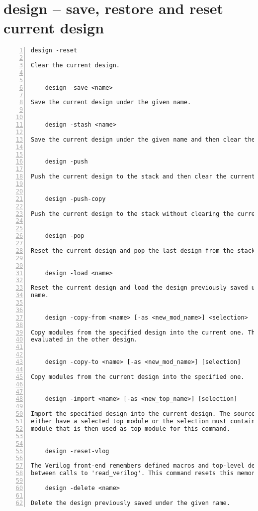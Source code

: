 \section{design -- save, restore and reset current design}
\label{cmd:design}
\begin{lstlisting}[numbers=left,frame=single]
    design -reset

Clear the current design.


    design -save <name>

Save the current design under the given name.


    design -stash <name>

Save the current design under the given name and then clear the current design.


    design -push

Push the current design to the stack and then clear the current design.


    design -push-copy

Push the current design to the stack without clearing the current design.


    design -pop

Reset the current design and pop the last design from the stack.


    design -load <name>

Reset the current design and load the design previously saved under the given
name.


    design -copy-from <name> [-as <new_mod_name>] <selection>

Copy modules from the specified design into the current one. The selection is
evaluated in the other design.


    design -copy-to <name> [-as <new_mod_name>] [selection]

Copy modules from the current design into the specified one.


    design -import <name> [-as <new_top_name>] [selection]

Import the specified design into the current design. The source design must
either have a selected top module or the selection must contain exactly one
module that is then used as top module for this command.


    design -reset-vlog

The Verilog front-end remembers defined macros and top-level declarations
between calls to 'read_verilog'. This command resets this memory.

    design -delete <name>

Delete the design previously saved under the given name.
\end{lstlisting}

